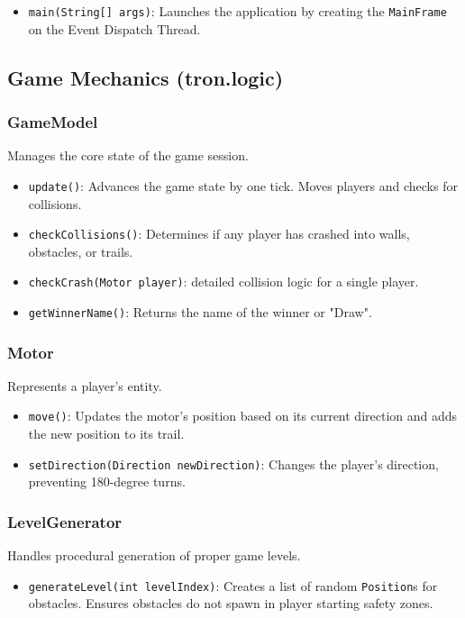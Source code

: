 \documentclass[12pt,a4paper]{article}
\begin{document}
\begin{itemize}
    \item \texttt{main(String[] args)}: Launches the application by creating the \texttt{MainFrame} on the Event Dispatch Thread.
\end{itemize}

\subsection{Game Mechanics (tron.logic)}

\subsubsection{GameModel}
Manages the core state of the game session.

\begin{itemize}
    \item \texttt{update()}: Advances the game state by one tick. Moves players and checks for collisions.
    \item \texttt{checkCollisions()}: Determines if any player has crashed into walls, obstacles, or trails.
    \item \texttt{checkCrash(Motor player)}: detailed collision logic for a single player.
    \item \texttt{getWinnerName()}: Returns the name of the winner or "Draw".
\end{itemize}

\subsubsection{Motor}
Represents a player's entity.

\begin{itemize}
    \item \texttt{move()}: Updates the motor's position based on its current direction and adds the new position to its trail.
    \item \texttt{setDirection(Direction newDirection)}: Changes the player's direction, preventing 180-degree turns.
\end{itemize}

\subsubsection{LevelGenerator}
Handles procedural generation of proper game levels.

\begin{itemize}
    \item \texttt{generateLevel(int levelIndex)}: Creates a list of random \texttt{Position}s for obstacles. Ensures obstacles do not spawn in player starting safety zones.
\end{itemize}
\end{document}
